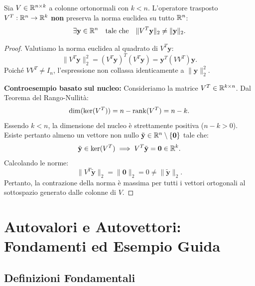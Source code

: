 \begin{proposition}
\label{prop:non-isometria-sinistra}
Sia $V \in \mathbb{R}^{n \times k}$ a colonne ortonormali con $k < n$. L'operatore trasposto $V^T: \mathbb{R}^n \to \mathbb{R}^k$ \textbf{non} preserva la norma euclidea su tutto $\mathbb{R}^n$:
\begin{equation}
    \exists \mathbf{y} \in \mathbb{R}^n \quad \text{tale che} \quad \|V^T \mathbf{y}\|_2 \neq \|\mathbf{y}\|_2.
\end{equation}
\end{proposition}

\begin{proof}
Valutiamo la norma euclidea al quadrato di $V^T \mathbf{y}$:
\begin{equation}
    \|V^T \mathbf{y}\|_2^2 = (V^T \mathbf{y})^T (V^T \mathbf{y}) = \mathbf{y}^T (V V^T) \mathbf{y}.
\end{equation}
Poich\'e $V V^T \neq I_n$, l'espressione non collassa identicamente a $\|\mathbf{y}\|_2^2$.

\medskip
\noindent\textbf{Controesempio basato sul nucleo:}
Consideriamo la matrice $V^T \in \mathbb{R}^{k \times n}$. Dal Teorema del Rango-Nullit\`a:
\begin{equation}
    \dim(\ker(V^T)) = n - \operatorname{rank}(V^T) = n - k.
\end{equation}
Essendo $k < n$, la dimensione del nucleo \`e strettamente positiva ($n - k > 0$). Esiste pertanto almeno un vettore non nullo $\tilde{\mathbf{y}} \in \mathbb{R}^n \setminus \{\mathbf{0}\}$ tale che:
\begin{equation}
    \tilde{\mathbf{y}} \in \ker(V^T) \implies V^T \tilde{\mathbf{y}} = \mathbf{0} \in \mathbb{R}^k.
\end{equation}
Calcolando le norme:
\begin{equation}
    \|V^T \tilde{\mathbf{y}}\|_2 = \|\mathbf{0}\|_2 = 0 \neq \|\tilde{\mathbf{y}}\|_2.
\end{equation}
Pertanto, la contrazione della norma \`e massima per tutti i vettori ortogonali al sottospazio generato dalle colonne di $V$.
\end{proof}

\FloatBarrier
\section{Autovalori e Autovettori: Fondamenti ed Esempio Guida}

\subsection{Definizioni Fondamentali}

